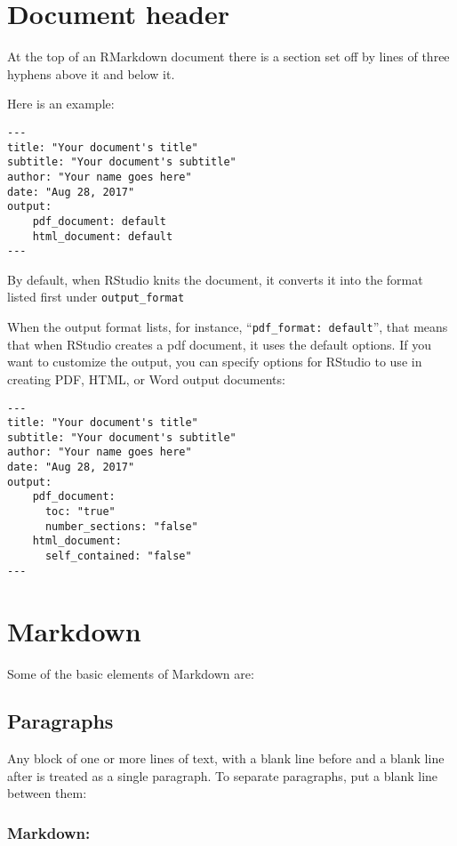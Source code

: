 \documentclass[
]{article}
\begin{document}
\hypertarget{document-header}{%
\section{Document header}\label{document-header}}

At the top of an RMarkdown document there is a section set off by lines
of three hyphens above it and below it.

Here is an example:

\begin{verbatim}
---
title: "Your document's title"
subtitle: "Your document's subtitle"
author: "Your name goes here"
date: "Aug 28, 2017"
output:
    pdf_document: default
    html_document: default
---
\end{verbatim}

By default, when RStudio knits the document, it converts it into the
format listed first under \texttt{output\_format}

When the output format lists, for instance,
``\texttt{pdf\_format:\ default}'', that means that when RStudio creates
a pdf document, it uses the default options. If you want to customize
the output, you can specify options for RStudio to use in creating PDF,
HTML, or Word output documents:

\begin{verbatim}
---
title: "Your document's title"
subtitle: "Your document's subtitle"
author: "Your name goes here"
date: "Aug 28, 2017"
output:
    pdf_document:
      toc: "true" 
      number_sections: "false"
    html_document:
      self_contained: "false"
---
\end{verbatim}

\hypertarget{markdown}{%
\section{Markdown}\label{markdown}}

Some of the basic elements of Markdown are:

\hypertarget{paragraphs}{%
\subsection{Paragraphs}\label{paragraphs}}

Any block of one or more lines of text, with a blank line before and a
blank line after is treated as a single paragraph. To separate
paragraphs, put a blank line between them:

\hypertarget{markdown-1}{%
\subsubsection{Markdown:}\label{markdown-1}}
\end{document}
